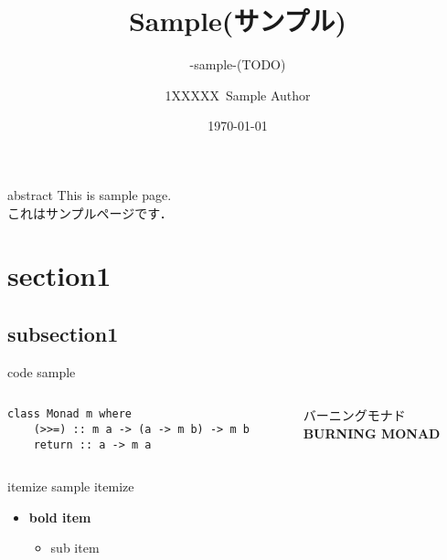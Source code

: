 \documentclass[aspectratio=1610,dvipdfmx,ja=standard,14pt]{beamer}
\title{%
    Sample(サンプル)
}
\subtitle{
    -sample-(TODO)
}
\institute[Sample Univ.]{%
    Sample Univ. 
}
\author{%
    1XXXXX\ Sample Author
}
\date{%
    \today
}
\begin{document}
%
%
\begin{frame}
\maketitle 
\end{frame}

\begin{frame}[fragile]{abstract}
This is sample page.\\[4pt] 
これはサンプルページです．
\end{frame}

\section{section1}
\subsection{subsection1}

\begin{frame}
    \tableofcontents[currentsection]
\end{frame}

\begin{frame}[fragile]{code sample}
    \begin{columns}
        \begin{column}{0.5\textwidth}
            \begin{lstlisting}
class Monad m where 
    (>>=) :: m a -> (a -> m b) -> m b 
    return :: a -> m a
            \end{lstlisting}
        \end{column}
        \begin{column}{0.5\textwidth}
            バーニングモナド \\
            \textbf{BURNING MONAD}
        \end{column}
    \end{columns}
\end{frame}

\begin{frame}{itemize sample}
    itemize
    \begin{itemize}
        \item \textbf{bold item}
        \begin{itemize}
            \item sub item
        \end{itemize}
    \end{itemize}
\end{frame}
\end{document}
